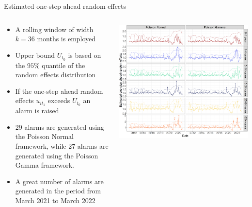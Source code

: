 \documentclass[aspectratio=169]{beamer}
\begin{document}
\begin{frame}{Estimated one-step ahead random effects}
\begin{columns}
\begin{column}{.50\textwidth}
\begin{itemize}
  \item<1> A rolling window of width $k=36$ months is employed
  \item<1> Upper bound $U_{t_0}$ is based on the $95\%$ quantile of the random effects distribution
  \item<1> If the one-step ahead random effects $u_{it_1}$ exceeds $U_{t_0}$ an alarm is raised
\end{itemize}
\vspace{.1cm}
\begin{itemize}
  \item<2> 29 alarms are generated using the Poisson Normal framework, while 27 alarms are generated using the Poisson Gamma framework.
  \item<2> A great number of alarms are generated in the period from March 2021 to March 2022
\end{itemize}
\end{column}
\hfill
\begin{column}{.46\textwidth}

 \tiny


\includegraphics[width=1\linewidth]{../figures/Compare_novel_STEC_95} 

 \normalsize
\end{column}
\end{columns}
\end{frame}
\end{document}
